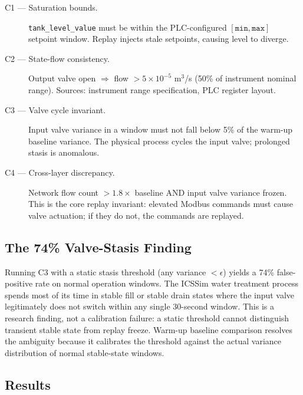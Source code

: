 \documentclass[sigconf,anonymous,review]{acmart}
\begin{document}
\begin{description}
  \item[C1 — Saturation bounds.] \texttt{tank\_level\_value} must be within
    the PLC-configured $[\texttt{min}, \texttt{max}]$ setpoint window.
    Replay injects stale setpoints, causing level to diverge.

  \item[C2 — State-flow consistency.] Output valve open $\Rightarrow$ flow
    $> 5 \times 10^{-5}$ m$^3$/s (50\% of instrument nominal range).
    Sources: instrument range specification, PLC register layout.

  \item[C3 — Valve cycle invariant.] Input valve variance in a window must
    not fall below 5\% of the warm-up baseline variance.
    The physical process cycles the input valve; prolonged stasis is anomalous.

  \item[C4 — Cross-layer discrepancy.] Network flow count $> 1.8\times$
    baseline AND input valve variance frozen.
    This is the core replay invariant: elevated Modbus commands must cause
    valve actuation; if they do not, the commands are replayed.
\end{description}

\subsection{The 74\% Valve-Stasis Finding}
\label{sec:74pct}
Running C3 with a static stasis threshold (any variance $< \epsilon$) yields
a 74\% false-positive rate on normal operation windows.  The ICSSim water
treatment process spends most of its time in stable fill or stable drain
states where the input valve legitimately does not switch within any single
30-second window.  This is a research finding, not a calibration failure:
a static threshold cannot distinguish transient stable state from replay
freeze.  Warm-up baseline comparison resolves the ambiguity because it
calibrates the threshold against the actual variance distribution of normal
stable-state windows.

\subsection{Results}
\end{document}
